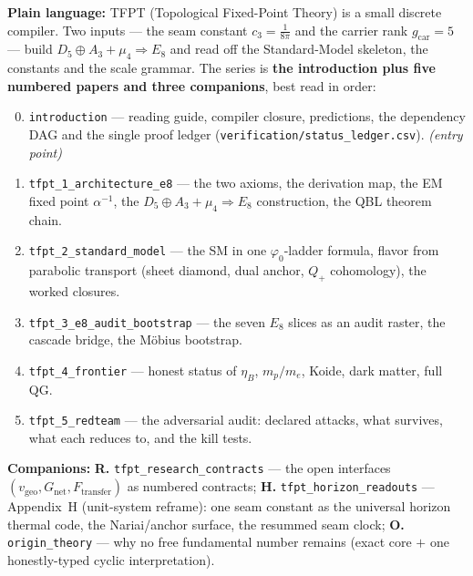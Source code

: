 \begin{keybox}
\textbf{Plain language:} TFPT (Topological Fixed-Point Theory) is a small discrete compiler. Two
inputs --- the seam constant $c_3=\tfrac1{8\pi}$ and the carrier rank $g_{\mathrm{car}}=5$ --- build
$D_5\oplus A_3+\mu_4\Rightarrow E_8$ and read off the Standard-Model skeleton, the constants and the
scale grammar. The series is \textbf{the introduction plus five numbered papers and three companions},
best read in order:
\begin{enumerate}[leftmargin=2.0em,itemsep=1pt,label=\textbf{\arabic*.}]
\setcounter{enumi}{-1}
\item \texttt{introduction} --- reading guide, compiler closure, predictions, the dependency DAG and the
      single proof ledger (\texttt{verification/status\_ledger.csv}). \emph{(entry point)}
\item \texttt{tfpt\_1\_architecture\_e8} --- the two axioms, the derivation map, the EM fixed point
      $\alpha^{-1}$, the $D_5\oplus A_3+\mu_4\Rightarrow E_8$ construction, the QBL theorem chain.
\item \texttt{tfpt\_2\_standard\_model} --- the SM in one $\varphi_0$-ladder formula, flavor from
      parabolic transport (sheet diamond, dual anchor, $Q_+$ cohomology), the worked closures.
\item \texttt{tfpt\_3\_e8\_audit\_bootstrap} --- the seven $E_8$ slices as an audit raster, the cascade
      bridge, the M\"obius bootstrap.
\item \texttt{tfpt\_4\_frontier} --- honest status of $\eta_B$, $m_p/m_e$, Koide, dark matter, full QG.
\item \texttt{tfpt\_5\_redteam} --- the adversarial audit: declared attacks, what survives, what each
      reduces to, and the kill tests.
\end{enumerate}
\noindent\textbf{Companions:} \textbf{R.} \texttt{tfpt\_research\_contracts} --- the open interfaces
$(v_{\mathrm{geo}}, G_{\mathrm{net}}, F_{\mathrm{transfer}})$ as numbered contracts;
\textbf{H.} \texttt{tfpt\_horizon\_readouts} --- Appendix~H (unit-system reframe): one seam constant as
the universal horizon thermal code, the Nariai/anchor surface, the resummed seam clock;
\textbf{O.} \texttt{origin\_theory} --- why no free fundamental number remains (exact core $+$ one
honestly-typed cyclic interpretation).
\end{keybox}
